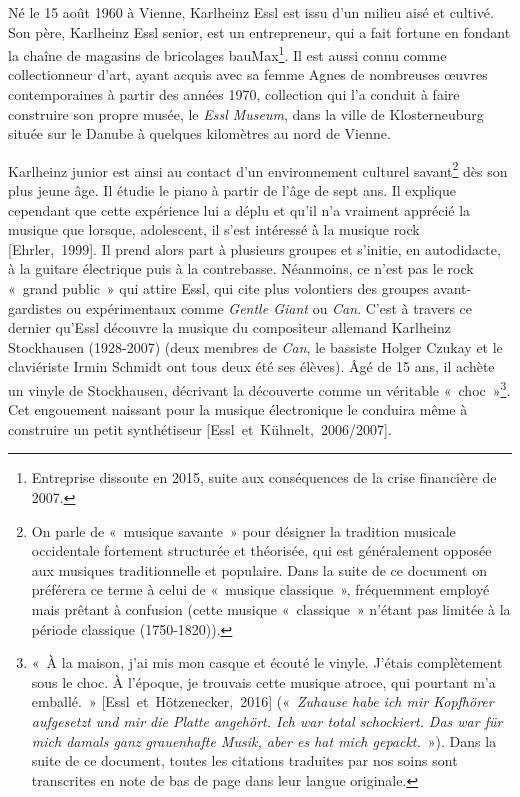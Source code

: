 \documentclass[a4paper,12pt]{article}
\newcommand{\guill}[1]{«~#1~»}
\newcommand{\cicite}[1]{{\footnotesize[#1]}}
\begin{document}
Né le 15 août 1960 à Vienne, Karlheinz Essl est issu d'un milieu aisé et cultivé. Son père, Karlheinz Essl senior, est un entrepreneur, qui a fait fortune en fondant la chaîne de magasins de bricolages bauMax\footnote{Entreprise dissoute en 2015, suite aux conséquences de la crise financière de 2007.}. Il est aussi connu comme collectionneur d'art, ayant acquis avec sa femme Agnes de nombreuses œuvres contemporaines à partir des années 1970, collection qui l'a conduit à faire construire son propre musée, le \emph{Essl Museum}, dans la ville de Klosterneuburg située sur le Danube à quelques kilomètres au nord de Vienne.

Karlheinz junior est ainsi au contact d'un environnement culturel savant\footnote{On parle de \guill{musique savante} pour désigner la tradition musicale occidentale fortement structurée et théorisée, qui est généralement opposée aux musiques traditionnelle et populaire. Dans la suite de ce document on préférera ce terme à celui de \guill{musique classique}, fréquemment employé mais prêtant à confusion (cette musique \guill{classique} n'étant pas limitée à la période classique (1750-1820)).} dès son plus jeune âge. Il étudie le piano à partir de l'âge de sept ans. Il explique cependant que cette expérience lui a déplu et qu'il n'a vraiment apprécié la musique que lorsque, adolescent, il s'est intéressé à la musique rock \cicite{Ehrler,~1999}. Il prend alors part à plusieurs groupes et s'initie, en autodidacte, à la guitare électrique puis à la contrebasse. Néanmoins, ce n'est pas le rock \guill{grand public} qui attire Essl, qui cite plus volontiers des groupes avant-gardistes ou expérimentaux comme \emph{Gentle Giant} ou \emph{Can}. C'est à travers ce dernier qu'Essl découvre la musique du compositeur allemand Karlheinz Stockhausen (1928-2007) (deux membres de \emph{Can}, le bassiste Holger Czukay et le claviériste Irmin Schmidt ont tous deux été ses élèves). Âgé de 15 ans, il achète un vinyle de Stockhausen, décrivant la découverte comme un véritable \guill{choc}\footnote{\guill{À la maison, j'ai mis mon casque et écouté le vinyle. J'étais complètement sous le choc. À l'époque, je trouvais cette musique atroce, qui pourtant m'a emballé.} \cicite{Essl~et~Hötzenecker,~2016} (\guill{\emph{Zuhause habe ich mir Kopfhörer aufgesetzt und mir die Platte angehört. Ich war total schockiert. Das war für mich damals ganz grauenhafte Musik, aber es hat mich gepackt.}}). Dans la suite de ce document, toutes les citations traduites par nos soins sont transcrites en note de bas de page dans leur langue originale.}. Cet engouement naissant pour la musique électronique le conduira même à construire un petit synthétiseur \cicite{Essl~et~Kühnelt,~2006/2007}.
\end{document}
